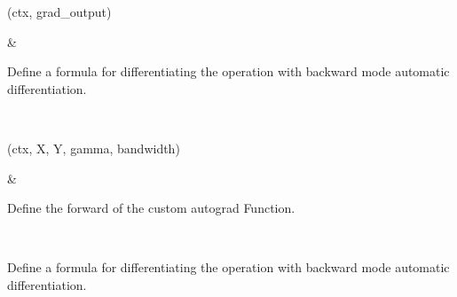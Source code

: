 \documentclass[letterpaper,10pt,english]{sphinxmanual}
\begin{document}
\begin{fulllineitems}
\begin{savenotes}
\begin{longtable}{}
\endlastfoot
\sphinxtableatstartofbodyhook
\begin{varwidth}[t]{}
\sphinxAtStartPar
{\hyperref[\detokenize{dtw_loss_functions.soft_dtw_implementations.soft_dtw_cuda_ron.autograd_xy:dtw_loss_functions.soft_dtw_implementations.soft_dtw_cuda_ron.autograd_xy.SoftDTWXYAutograd.backward}]{}}(ctx, grad\_output)
\sphinxbeforeendvarwidth
\end{varwidth}%
&\begin{varwidth}[t]{}
\sphinxAtStartPar
Define a formula for differentiating the operation with backward mode automatic differentiation.
\sphinxbeforeendvarwidth
\end{varwidth}%
\\
\sphinxhline\begin{varwidth}[t]{}
\sphinxAtStartPar
{\hyperref[\detokenize{dtw_loss_functions.soft_dtw_implementations.soft_dtw_cuda_ron.autograd_xy:dtw_loss_functions.soft_dtw_implementations.soft_dtw_cuda_ron.autograd_xy.SoftDTWXYAutograd.forward}]{}}(ctx, X, Y, gamma, bandwidth)
\sphinxbeforeendvarwidth
\end{varwidth}%
&\begin{varwidth}[t]{}
\sphinxAtStartPar
Define the forward of the custom autograd Function.
\sphinxbeforeendvarwidth
\end{varwidth}%
\\
\sphinxbottomrule
\end{longtable}
\sphinxtableafterendhook
\sphinxatlongtableend
\end{savenotes}

\begin{fulllineitems}
\label{\detokenize{dtw_loss_functions.soft_dtw_implementations.soft_dtw_cuda_ron.autograd_xy:dtw_loss_functions.soft_dtw_implementations.soft_dtw_cuda_ron.autograd_xy.SoftDTWXYAutograd.backward}}
\pysigstartsignatures
\pysiglinewithargsret
{}
{\sphinxparamcomma {}}
{}
\pysigstopsignatures
\sphinxAtStartPar
Define a formula for differentiating the operation with backward mode automatic differentiation.


\end{fulllineitems}
\end{fulllineitems}
\end{document}
